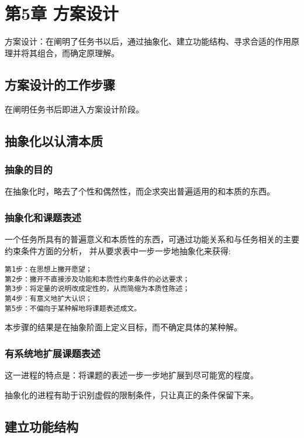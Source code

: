 \documentclass[letterpaper,10pt,english]{sphinxmanual}
\begin{document}
\chapter{第5章 方案设计}
\label{unit5::doc}\label{unit5:id1}
方案设计：在阐明了任务书以后，通过抽象化、建立功能结构、寻求合适的作用原理并将其组合，而确定原理解。


\section{方案设计的工作步骤}
\label{unit5:id2}
在阐明任务书后即进入方案设计阶段。


\section{抽象化以认清本质}
\label{unit5:id3}

\subsection{抽象的目的}
\label{unit5:id4}
在抽象化时，略去了个性和偶然性，而企求突出普遍适用的和本质的东西。


\subsection{抽象化和课题表述}
\label{unit5:id5}
一个任务所具有的普遍意义和本质性的东西，可通过功能关系和与任务相关的主要约束条件方面的分析，
并从要求表中一步一步地抽象化来获得:

\begin{Verbatim}[commandchars=\\\{\}]
第1步：在思想上撇开愿望；
第2步：撇开不直接涉及功能和本质性约束条件的必达要求；
第3步：将定量的说明改成定性的，从而简缩为本质性陈述；
第4步：有意义地扩大认识；
第5步：不偏向于某种解地将课题表述成文。
\end{Verbatim}

本步骤的结果是在抽象阶面上定义目标，而不确定具体的某种解。


\subsection{有系统地扩展课题表述}
\label{unit5:id6}
这一进程的特点是：将课题的表述一步一步地扩展到尽可能宽的程度。

抽象化的进程有助于识别虚假的限制条件，只让真正的条件保留下来。


\section{建立功能结构}
\label{unit5:id7}
\end{document}
